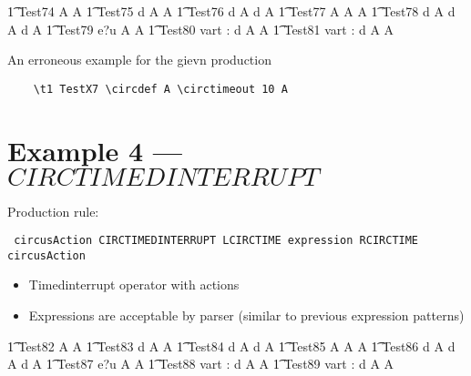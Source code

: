 \documentclass{article}
\begin{document}
\begin{circusaction}
   \t1 Test74 \circdef A  A
   \also
   \t1 Test75 \circdef d \then A  A 
   \also
   \t1 Test76 \circdef d \then A  d \then A 
   \also
   \t1 Test77 \circdef A  A \circseq A
   \also
   \t1 Test78 \circdef d \then A  d \then A \circseq  
   d \then A
   \also
   \t1 Test79 \circdef e?u \then A  A
   \also
   \t1 Test80 \circdef \circvres vart : \nat \circspot d \then A  A
   \also
   \t1 Test81 \circdef \circvres vart : \nat \circspot d \then A  A
\end{circusaction}

An erroneous example for the gievn production 
\begin{verbatim}
	\t1 TestX7 \circdef A \circtimeout 10 A
\end{verbatim}

\section{Example 4 --- $CIRCTIMEDINTERRUPT$}

Production rule:
\begin{verbatim}
 circusAction CIRCTIMEDINTERRUPT LCIRCTIME expression RCIRCTIME circusAction
\end{verbatim}
	
\begin{itemize}
	\item Timedinterrupt operator with actions
	\item Expressions are acceptable by parser (similar to previous expression patterns)
\end{itemize}


\begin{circusaction}
   \t1 Test82 \circdef A  A
   \also
   \t1 Test83 \circdef d \then A  A 
   \also
   \t1 Test84 \circdef d \then A  d \then A 
   \also
   \t1 Test85 \circdef A  A \circseq A
   \also
   \t1 Test86 \circdef d \then A  d \then A  
   \circseq d \then A
   \also
   \t1 Test87 \circdef e?u \then A  A
   \also
   \t1 Test88 \circdef \circvres vart : \nat \circspot d \then A  A
   \also
   \t1 Test89 \circdef \circvres vart : \nat \circspot d \then A  A
\end{circusaction}
	
\end{document}
